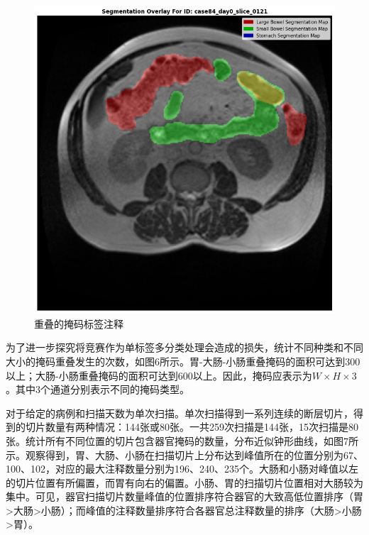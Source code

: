 \documentclass[letterpaper, 10pt, conference, twoside]{ieeeconf}
\begin{document}
\begin{figure}[htbp]
  \centering
  \includegraphics[width = 1\linewidth]{seg_overlay.png}
  \caption{重叠的掩码标签注释}
  \label{fig:fig5}
\end{figure}

为了进一步探究将竞赛作为单标签多分类处理会造成的损失，统计不同种类和不同大小的掩码重叠发生的次数，如图6所示。胃-大肠-小肠重叠掩码的面积可达到300以上；大肠-小肠重叠掩码的面积可达到600以上。因此，掩码应表示为$W\times H\times 3$。其中3个通道分别表示不同的掩码类型。

对于给定的病例和扫描天数为单次扫描。单次扫描得到一系列连续的断层切片，得到的切片数量有两种情况：144张或80张。一共259次扫描是144张，15次扫描是80张。统计所有不同位置的切片包含器官掩码的数量，分布近似钟形曲线，如图7所示。观察得到，胃、大肠、小肠在扫描切片上分布达到峰值所在的位置分别为67、100、102，对应的最大注释数量分别为196、240、235个。大肠和小肠对峰值以左的切片位置有所偏置，而胃有向右的偏置。小肠、胃的扫描切片位置相对大肠较为集中。可见，器官扫描切片数量峰值的位置排序符合器官的大致高低位置排序（胃>大肠>小肠）；而峰值的注释数量排序符合各器官总注释数量的排序（大肠>小肠>胃）。
\end{document}
